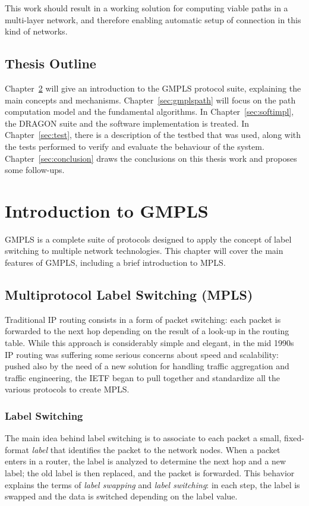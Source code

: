 \documentclass[10pt,a4paper]{report}
\begin{document}
This work should result in a working solution for computing viable
paths in a multi-layer network, and therefore enabling automatic setup
of connection in this kind of networks.

\section{Thesis Outline}

Chapter~\ref{sec:introgmpls} will give an introduction to the GMPLS
protocol suite, explaining the main concepts and
mechanisms. Chapter~\ref{sec:gmplspath} will focus on the path
computation model and the fundamental algorithms. In
Chapter~\ref{sec:softimpl}, the DRAGON suite and the software
implementation is treated. In Chapter~\ref{sec:test}, there is a
description of the testbed that was used, along with the tests
performed to verify and evaluate the behaviour of the
system. Chapter~\ref{sec:conclusion} draws the conclusions on this
thesis work and proposes some follow-ups.

\chapter{Introduction to GMPLS}\label{sec:introgmpls}
GMPLS is a complete suite of protocols designed to apply the concept
of label switching to multiple network technologies. This chapter will
cover the main features of GMPLS, including a brief introduction to
MPLS.

\section{Multiprotocol Label Switching (MPLS)}
Traditional IP routing consists in a form of packet switching: each
packet is forwarded to the next hop depending on the result of a
look-up in the routing table. While this approach is considerably
simple and elegant, in the mid 1990s IP routing was suffering some
serious concerns about speed and scalability: pushed also by the need
of a new solution for handling traffic aggregation and traffic
engineering, the IETF began to pull together and standardize all the
various protocols to create MPLS.

\subsection{Label Switching}
The main idea behind label switching is to associate to each packet a
small, fixed-format \textit{label} that identifies the packet to the
network nodes. When a packet enters in a router, the label is analyzed
to determine the next hop and a new label; the old label is then
replaced, and the packet is forwarded. This behavior explains the
terms of \textit{label swapping} and \textit{label switching}: in each
step, the label is swapped and the data is switched depending on the
label value.
\end{document}
